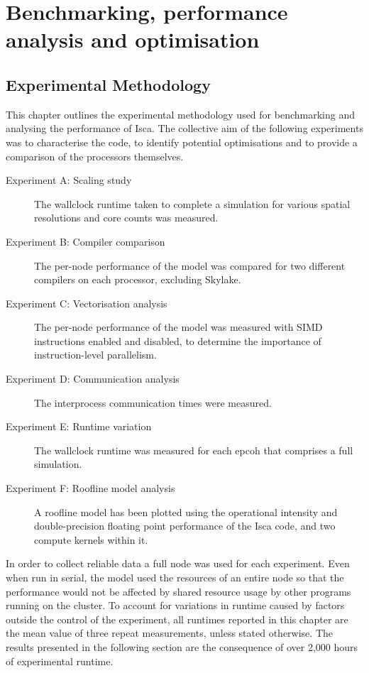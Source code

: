 \documentclass[a4paper,11pt]{report}
\begin{document}
\part{Benchmarking, performance analysis and optimisation}
\chapter{Experimental Methodology}
This chapter outlines the experimental methodology used for benchmarking and analysing the performance of Isca. The collective aim of the following experiments was to characterise the code, to identify potential optimisations and to provide a comparison of the processors themselves.

\begin{description}

	\item[Experiment A: Scaling study] The wallclock runtime taken to complete a simulation for various spatial resolutions and core counts was measured.
	
	\item[Experiment B: Compiler comparison] The per-node performance of the model was compared for two different compilers on each processor, excluding Skylake.
	
	\item[Experiment C: Vectorisation analysis] The per-node performance of the model was measured with SIMD instructions enabled and disabled, to determine the importance of instruction-level parallelism. 
	
	\item[Experiment D: Communication analysis] The interprocess communication times were measured. 
	
	\item[Experiment E: Runtime variation] The wallclock runtime was measured for each epcoh that comprises a full simulation.
	
	\item[Experiment F: Roofline model analysis] A roofline model has been plotted using the operational intensity and double-precision floating point performance of the Isca code, and two compute kernels within it. 
\end{description}
\par
In order to collect reliable data a full node was used for each experiment. Even when run in serial, the model used the resources of an entire node so that the performance would not be affected by shared resource usage by other programs running on the cluster. To account for variations in runtime caused by factors outside the control of the experiment, all runtimes reported in this chapter are the mean value of three repeat measurements, unless stated otherwise. The results presented in the following section are the consequence of over 2,000 hours of experimental runtime.
\end{document}
